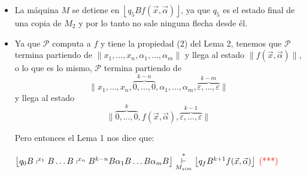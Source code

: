 \begin{frame}
  \begin{block}{}
    \begin{itemize}
      \item La máquina $M$ se detiene en $\left\lfloor q_{5} B f(\vec{x},\vec{\alpha}) \right\rfloor$, ya que $q_{5}$ es
        el estado final de una copia de $M_{2}$ y por lo tanto no sale ninguna flecha desde él.

      \item Ya que $\mathcal{P}$ computa a $f$ y tiene la propiedad (2) del Lema 2, tenemos que $\mathcal{P}$ termina
        partiendo de $\lVert x_{1}, \dotsc, x_{n}, \alpha_{1}, \dotsc, \alpha_{m} \rVert$ y llega al estado $\lVert
        f(\vec{x},\vec{\alpha}) \rVert$, o lo que es lo mismo, $\mathcal{P}$ termina partiendo de
        \begin{equation*}
          \lVert x_{1}, \dotsc, x_{n}, \overset{k-n}{\overbrace{0,\dotsc,0}}, \alpha_{1}, \dotsc, \alpha_{m},
          \overset{k-m}{\overbrace{\varepsilon,\dotsc,\varepsilon}} \rVert
        \end{equation*}
        \PN y llega al estado
        \begin{equation*}
          \lVert \overset{k}{\overbrace{0,\dotsc,0}}, f(\vec{x}, \vec{\alpha}), \overset{k-1}{\overbrace{\varepsilon,
          \dotsc,\varepsilon}} \rVert
        \end{equation*}

        \PN Pero entonces el Lema 1 nos dice que:
        \begin{center}
          $\left\lfloor q_{0} B \shortmid^{x_{1}} B \dotsc B \shortmid^{x_{n}} B^{k-n}B \alpha_{1} B \dotsc B \alpha_{m}
          B \right\rfloor \overset{\ast}{\underset{M_{sim}}{\vdash}} \left\lfloor q_{f} B^{k+1} f(\vec{x},\vec{\alpha})
          \right\rfloor $ \textcolor{red}{(***)}
        \end{center}
    \end{itemize}
  \end{block}
\end{frame}
